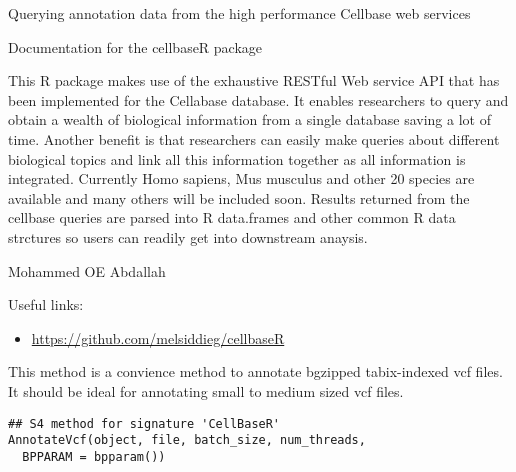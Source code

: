 \documentclass[letterpaper]{book}
\begin{document}
%
\begin{Description}\relax
Querying annotation data from the high performance Cellbase web
services
\end{Description}
%
\begin{Details}\relax
Documentation for the cellbaseR package

This R package makes use of the exhaustive RESTful Web service 
API that has been
implemented for the Cellabase database. It enables researchers to query and
obtain a wealth of biological information from a single database saving a lot 
of time. Another benefit is that researchers can easily make  queries about 
different biological topics and link all this information together as all 
information is integrated.
Currently Homo sapiens, Mus musculus and other 20 species are available and 
many others will be included soon. Results returned from the cellbase queries
are parsed into R data.frames and other common R data strctures so users can 
readily get into downstream anaysis.
\end{Details}
%
\begin{Author}\relax
Mohammed OE Abdallah
\end{Author}
%
\begin{SeeAlso}\relax
Useful links:
\begin{itemize}

\item \url{https://github.com/melsiddieg/cellbaseR}

\end{itemize}


\end{SeeAlso}
%
\begin{Description}\relax
This method is a convience method to annotate bgzipped tabix-indexed vcf 
files. It should be ideal for annotating small to medium sized 
vcf files.
\end{Description}
%
\begin{Usage}
\begin{verbatim}
## S4 method for signature 'CellBaseR'
AnnotateVcf(object, file, batch_size, num_threads,
  BPPARAM = bpparam())
\end{verbatim}
\end{Usage}
\end{document}
